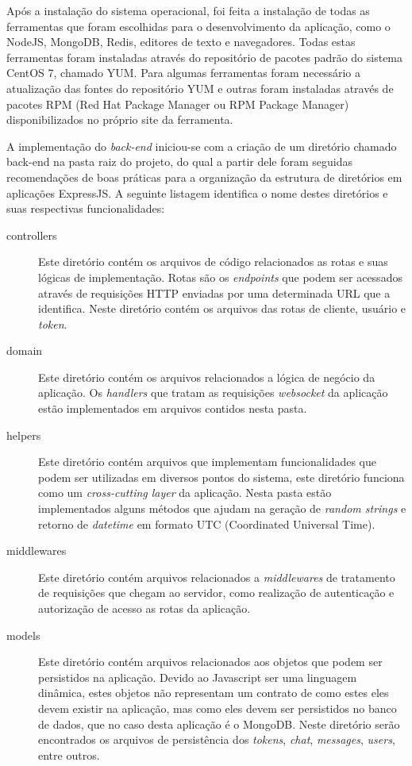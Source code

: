 Após a instalação do sistema operacional, foi feita a instalação de todas as ferramentas que foram escolhidas para o desenvolvimento da aplicação, como o NodeJS, MongoDB, Redis, editores de texto e navegadores. Todas estas ferramentas foram instaladas através do repositório de pacotes padrão do sistema CentOS 7, chamado YUM. Para algumas ferramentas foram necessário a atualização das fontes do repositório YUM e outras foram instaladas através de pacotes RPM (Red Hat Package Manager ou RPM Package Manager) disponibilizados no próprio site da ferramenta.

A implementação do \textit{back-end} iniciou-se com a criação de um diretório chamado back-end na pasta raiz do projeto, do qual a partir dele foram seguidas recomendações de boas práticas \cite{express-app-structure} para a organização da estrutura de diretórios em aplicações ExpressJS. A seguinte listagem identifica o nome destes diretórios e suas respectivas funcionalidades:

\begin{description}
	\item[controllers] Este diretório contém os arquivos de código relacionados as rotas e suas lógicas de implementação. Rotas são os \textit{endpoints} que podem ser acessados através de requisições HTTP enviadas por uma determinada URL que a identifica. Neste diretório contém os arquivos das rotas de cliente, usuário e \textit{token}.
	
	\item[domain] Este diretório contém os arquivos relacionados a lógica de negócio da aplicação. Os \textit{handlers} que tratam as requisições \textit{websocket} da aplicação estão implementados em arquivos contidos nesta pasta.
	
	\item[helpers] Este diretório contém arquivos que implementam funcionalidades que podem ser utilizadas em diversos pontos do sistema, este diretório funciona como um \textit{cross-cutting layer} da aplicação. Nesta pasta estão implementados alguns métodos que ajudam na geração de \textit{random strings} e retorno de \textit{datetime} em formato UTC (Coordinated Universal Time).
	
	\item[middlewares] Este diretório contém arquivos relacionados a \textit{middlewares} de tratamento de requisições que chegam ao servidor, como realização de autenticação e autorização de acesso as rotas da aplicação.
	
	\item[models] Este diretório contém arquivos relacionados aos objetos que podem ser persistidos na aplicação. Devido ao Javascript ser uma linguagem dinâmica, estes objetos não representam um contrato de como estes eles devem existir na aplicação, mas como eles devem ser persistidos no banco de dados, que no caso desta aplicação é o MongoDB. Neste diretório serão encontrados os arquivos de persistência dos \textit{tokens}, \textit{chat}, \textit{messages}, \textit{users}, entre outros.
\end{description}

